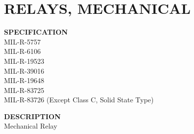 \section{RELAYS, MECHANICAL}

\begin{minipage}[t]{0.6\textwidth}
    \textbf{SPECIFICATION}\\
    MIL-R-5757\\MIL-R-6106\\MIL-R-19523\\MIL-R-39016\\MIL-R-19648\\MIL-R-83725\\MIL-R-83726 (Except Class C, Solid State Type)
\end{minipage}
\begin{minipage}[t]{0.39\textwidth}
    \textbf{DESCRIPTION}\\
    Mechanical Relay
\end{minipage}

